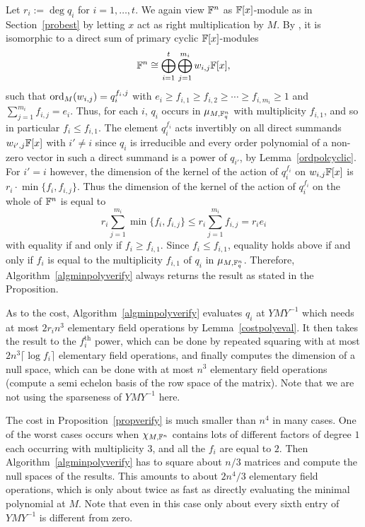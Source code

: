 \proofbeg Let $r_i := \deg q_i$ for $i = 1, \ldots, t$.
We again view $\mathbb{F}^n$ as $\mathbb{F}[x]$-module as in Section~\ref{probest} by
letting $x$ act as right multiplication by $M$. By 
\cite[Theorem~3.12]{Jacob1}, it is isomorphic to a direct sum of 
primary cyclic $\mathbb{F}[x]$-modules
\[ 
\mathbb{F}^n \cong \bigoplus_{i=1}^t \bigoplus_{j=1}^{m_i} w_{i,j} \mathbb{F}[x], 
\]
such that $\mathrm{ord}_M(w_{i,j}) = q_i^{f_i,j}$ with 
$e_i \ge f_{i,1} \ge f_{i,2} \ge \cdots \ge f_{i,m_i} \ge 1$ and
$\sum_{j=1}^{m_i} f_{i,j} = e_i$. Thus, for each $i$,
$q_i$ occurs in  $\mu_{M,\mathbb{F}_q^n}$ with multiplicity $f_{i,1}$,
and so in particular $f_i\le f_{i,1}$.
The element $q_i^{f_i}$ acts
invertibly on all direct summands $w_{i',j} \mathbb{F}[x]$ with $i' \neq i$
since $q_i$ is irreducible and every order polynomial of a non-zero vector
in such a direct summand is a power of $q_{i'}$, by 
Lemma~\ref{ordpolcyclic}. For $i' = i$ however, the dimension of the kernel 
of the action of $q_i^{f_i}$ on $w_{i,j} \mathbb{F}[x]$ is 
$r_i \cdot \min\{f_i,f_{i,j}\}$.
Thus the dimension of the kernel of the action of $q_i^{f_i}$ on the
whole of $\mathbb{F}^n$ is equal to 
\[
r_i\sum_{j=1}^{m_i}\min\{f_i,f_{i,j}\}
\le r_i\sum_{j=1}^{m_i}f_{i,j}=r_ie_i
\]
with equality if and only if $f_i\ge f_{i,1}$. 
Since $f_i\le f_{i,1}$, equality holds above if and only if $f_i$
is equal to the multiplicity $f_{i,1}$ of $q_i$ in  $\mu_{M,\mathbb{F}_q^n}$.
Therefore, Algorithm~\ref{algminpolyverify} always returns the
result as stated in the Proposition.

As to the cost, Algorithm~\ref{algminpolyverify} evaluates $q_i$ at 
$YMY^{-1}$ which needs at most $2r_i n^3$ elementary field operations
by Lemma~\ref{costpolyeval}. It then takes the result to the
$f_i^{\mathrm{th}}$ power, which can be done by repeated squaring
with at most $2n^3\lceil \log f_i \rceil$ elementary field operations, and 
finally computes the dimension of a null space, which can be done with at most
$n^3$ elementary field operations (compute a semi echelon basis
of the row space of the matrix). Note that we are not using the 
sparseness of $YMY^{-1}$ here.
\proofend

\begin{Rem}
The cost in Proposition~\ref{propverify} is much smaller than $n^4$ in
many cases. One of the worst cases occurs when $\chi_{M,\mathbb{F}^n}$ contains lots of
different factors of degree $1$ each occurring with multiplicity $3$, and 
all the $f_i$ are equal to $2$. Then Algorithm~\ref{algminpolyverify} has to
square about $n/3$ matrices and compute the null spaces of the results. 
This amounts to about
$2n^4/3$ elementary field operations, which is only about twice as fast as 
directly evaluating the minimal polynomial at $M$. Note that even in this case
only about every sixth entry of\/ $YMY^{-1}$ is different from zero. 
\end{Rem}

